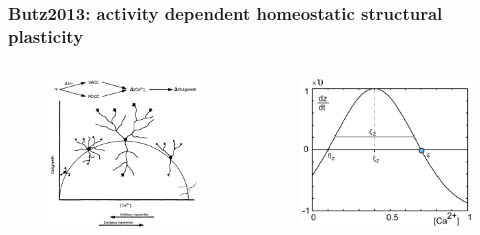 \begin{frame}[c]
  \frametitle{Butz2013: activity dependent homeostatic structural plasticity}
  \begin{columns}
    \begin{column}{0.5\textwidth}
      \begin{figure}[h]
        \centering
        \includegraphics[width=0.8\linewidth]{99_images/lipton1989}
      \end{figure}
    \end{column}
    \begin{column}{0.5\textwidth}
      \begin{figure}[h]
        \centering
        \includegraphics[width=0.8\linewidth]{99_images/growth-curve-general}
      \end{figure}
    \end{column}
  \end{columns}
\end{frame}
